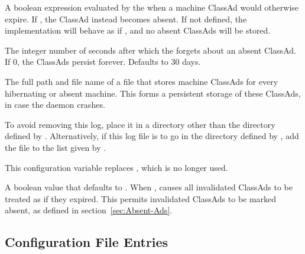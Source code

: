 \begin{description}

\label{param:AbsentRequirements}
\item[\Macro{ABSENT\_REQUIREMENTS}]
  A boolean expression evaluated by the  when a 
  machine ClassAd would otherwise expire.
  If , the ClassAd instead becomes absent.
  If not defined, the implementation will behave as if ,
  and no absent ClassAds will be stored.

\label{param:AbsentExpireAdsAfter}
\item[\Macro{ABSENT\_EXPIRE\_ADS\_AFTER}]
  The integer number of seconds after which the  
  forgets about an absent ClassAd.
  If 0, the ClassAds persist forever.  
  Defaults to 30 days.

\label{param:CollectorPersisentAdLog}
\item[\Macro{COLLECTOR\_PERSISTENT\_AD\_LOG}]
  The full path and file name of a file that stores machine ClassAds 
  for every hibernating or absent machine.  This forms a persistent storage
  of these ClassAds, in case the  daemon crashes.

  To avoid  removing this log, place it in a directory
  other than the directory defined by .  
  Alternatively, if this log file is to go in the 
  directory defined by , add the file to the list
  given by .

  This configuration variable replaces ,
  which is no longer used.

\label{param:ExpireInvalidatedAds}
\item[\Macro{EXPIRE\_INVALIDATED\_ADS}]
  A boolean value that defaults to .
  When , causes all invalidated ClassAds to be treated 
  as if they expired.
  This permits invalidated ClassAds to be marked absent,
  as defined in section~\ref{sec:Absent-Ads}.
\end{description}

\subsection{\label{sec:Negotiator-Config-File-Entries}
Configuration File Entries}

